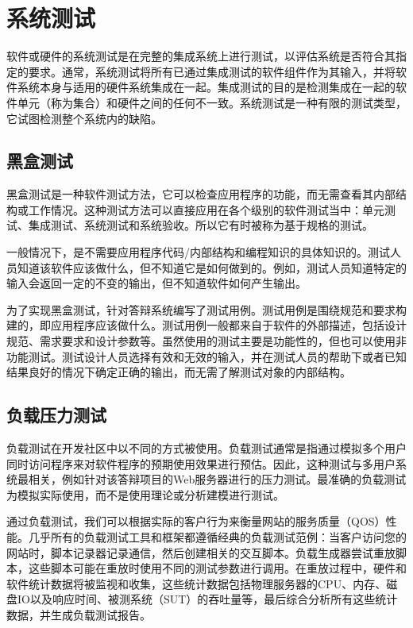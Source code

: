 \section{系统测试}

软件或硬件的系统测试是在完整的集成系统上进行测试，以评估系统是否符合其指定的要求。通常，系统测试将所有已通过集成测试的软件组件作为其输入，并将软件系统本身与适用的硬件系统集成在一起。集成测试的目的是检测集成在一起的软件单元（称为集合）和硬件之间的任何不一致。系统测试是一种有限的测试类型，它试图检测整个系统内的缺陷。

\subsection{黑盒测试}

黑盒测试是一种软件测试方法，它可以检查应用程序的功能，而无需查看其内部结构或工作情况。这种测试方法可以直接应用在各个级别的软件测试当中：单元测试、集成测试、系统测试和系统验收。所以它有时被称为基于规格的测试。

一般情况下，是不需要应用程序代码/内部结构和编程知识的具体知识的。测试人员知道该软件应该做什么，但不知道它是如何做到的。例如，测试人员知道特定的输入会返回一定的不变的输出，但不知道软件如何产生输出。

为了实现黑盒测试，针对答辩系统编写了测试用例。测试用例是围绕规范和要求构建的，即应用程序应该做什么。测试用例一般都来自于软件的外部描述，包括设计规范、需求要求和设计参数等。虽然使用的测试主要是功能性的，但也可以使用非功能测试。测试设计人员选择有效和无效的输入，并在测试人员的帮助下或者已知结果良好的情况下确定正确的输出，而无需了解测试对象的内部结构。

\subsection{负载压力测试}

负载测试在开发社区中以不同的方式被使用。负载测试通常是指通过模拟多个用户同时访问程序来对软件程序的预期使用效果进行预估。因此，这种测试与多用户系统最相关，例如针对该答辩项目的Web服务器进行的压力测试。最准确的负载测试为模拟实际使用，而不是使用理论或分析建模进行测试。

通过负载测试，我们可以根据实际的客户行为来衡量网站的服务质量（QOS）性能。几乎所有的负载测试工具和框架都遵循经典的负载测试范例：当客户访问您的网站时，脚本记录器记录通信，然后创建相关的交互脚本。负载生成器尝试重放脚本，这些脚本可能在重放时使用不同的测试参数进行调用。在重放过程中，硬件和软件统计数据将被监视和收集，这些统计数据包括物理服务器的CPU、内存、磁盘IO以及响应时间、被测系统（SUT）的吞吐量等，最后综合分析所有这些统计数据，并生成负载测试报告。

